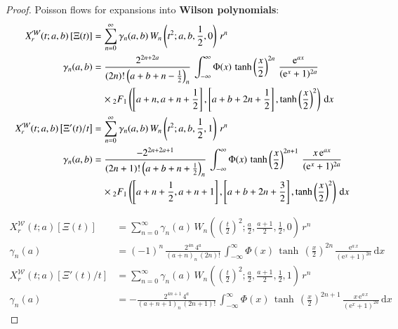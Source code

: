 \documentclass[a4paper,11pt,twoside]{amsart}
\newcommand{\verifiedeq}{=}
\newcommand{\verifiedeq}{\stackrel{\checkmark}{=}}
\begin{document}
\begin{proof}
Poisson flows for expansions into \textbf{Wilson polynomials}:
\begin{align}
X^\mathcal{W}_r(t;a,b)\left[\Xi(t)\right] &\verifiedeq \sum_{n=0}^\infty \gamma_n(a,b)\,W_n\left(t^2;a,b,\frac12,0\right)\,r^n \\
  \gamma_n(a,b) &\verifiedeq \frac{2^{2n+2a}}{(2n)!\left(a+b+n-\frac12\right)_n}\,\int_{-\infty}^{\infty} \Phi(x)\,\tanh\left(\frac{x}{2}\right)^{2n}\,\frac{\mathrm{e}^{ax}}{(\mathrm{e}^x+1)^{2a}}\\ &\quad \times {}_2F_1\left(\left[a+n, a+n+\frac12\right],\left[a+b+2n+\frac12\right],\tanh\left(\frac{x}{2}\right)^2\right)\,\mathrm{d}x \notag\\
X^\mathcal{W}_r(t;a,b)\left[\Xi'(t)/t\right] &\verifiedeq \sum_{n=0}^\infty \gamma_n(a,b)\,W_n\left(t^2;a,b,\frac12,1\right)\,r^n \\
  \gamma_n(a,b) &\verifiedeq \frac{-2^{2n+2a+1}}{(2n+1)!\left(a+b+n+\frac12\right)_n}\,\int_{-\infty}^{\infty} \Phi(x)\,\tanh\left(\frac{x}{2}\right)^{2n+1}\,\frac{x\,\mathrm{e}^{ax}}{(\mathrm{e}^x+1)^{2a}}\\ &\quad \times {}_2F_1\left(\left[a+n+\frac12, a+n+1\right],\left[a+b+2n+\frac32\right],\tanh\left(\frac{x}{2}\right)^2\right)\,\mathrm{d}x \notag
\end{align}

\begin{align}
X^\mathcal{W}_r(t;a)\left[\Xi(t)\right] &\verifiedeq \sum_{n=0}^\infty \gamma_{n}(a)\,W_{n}\left(\left(\frac{t}{2}\right)^2;\frac{a}{2},\frac{a+1}{2},\frac12,0\right)\,r^{n} \\
\gamma_n(a) &\verifiedeq (-1)^n\,\frac{2^{4n}\,4^a}{\left(a+n\right)_{n}\,(2n)!}\,\int_{-\infty}^{\infty} \Phi(x)\,\tanh\,\left(\frac{x}{2}\right)^{2n}\,\frac{\textrm{e}^{a\,x}}{(\textrm{e}^x+1)^{2a}}\,\mathrm{d}x \\
X^\mathcal{W}_r(t;a)\left[\Xi'(t)/t\right] &\verifiedeq \sum_{n=0}^\infty \gamma_{n}(a)\,W_{n}\left(\left(\frac{t}{2}\right)^2;\frac{a}{2},\frac{a+1}{2},\frac12,1\right)\,r^{n} \\
\gamma_n(a) &\verifiedeq -\frac{2^{4n+1}\,4^a}{\left(a+n+1\right)_{n}\,(2n+1)!}\,\int_{-\infty}^{\infty} \Phi(x)\,\tanh\,\left(\frac{x}{2}\right)^{2n+1}\,\frac{x\,\textrm{e}^{a\,x}}{(\textrm{e}^x+1)^{2a}}\,\mathrm{d}x
\end{align}


\end{proof}
\end{document}
